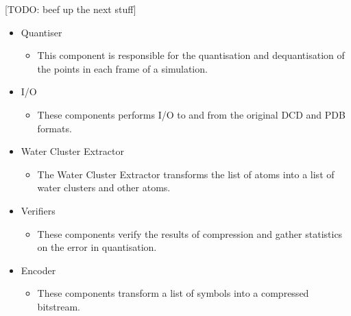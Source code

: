 \documentclass[a4paper,11pt]{report}
\begin{document}
[TODO: beef up the next stuff]
\begin{itemize}
 \item Quantiser
 \begin{itemize}
   \item This component is responsible for the quantisation and dequantisation of the points in each frame of a simulation.
 \end{itemize}
 \item I/O
 \begin{itemize}
   \item These components performs I/O to and from the original DCD and PDB formats. 
 \end{itemize}
 \item Water Cluster Extractor
 \begin{itemize}
   \item The Water Cluster Extractor transforms the list of atoms into a list of water clusters and other atoms.
 \end{itemize}
 \item Verifiers
 \begin{itemize}
   \item These components verify the results of compression and gather statistics on the error in quantisation.
 \end{itemize}
 \item Encoder
 \begin{itemize}
   \item These components transform a list of symbols into a compressed bitstream.
 \end{itemize}
\end{itemize}


% 

\end{document}
